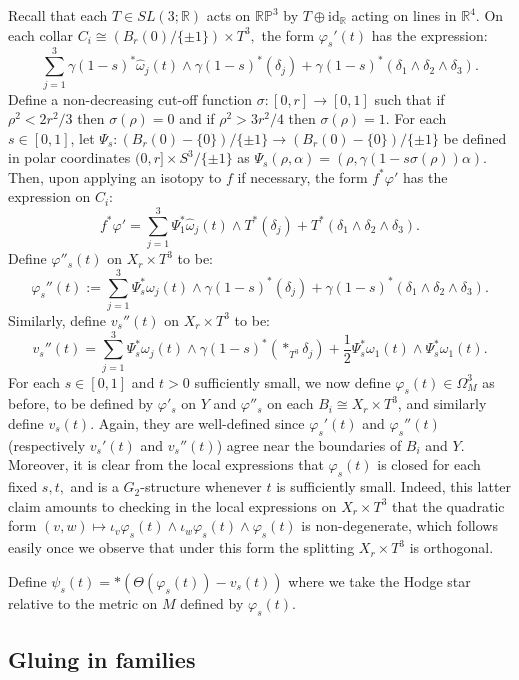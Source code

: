 \documentclass{amsart}
\theoremstyle{theorem}
\theoremstyle{definition}
\theoremstyle{definition}
\theoremstyle{definition}
\theoremstyle{theorem}
\theoremstyle{theorem}
\theoremstyle{theorem}
\theoremstyle{corollary}
\theoremstyle{question}
\theoremstyle{remark}
\begin{document}
Recall that each $T\in SL(3; \mathbb{R})$ acts on $\mathbb{RP}^3$ by $T\oplus \text{id}_\mathbb{R}$ acting on lines in $\mathbb{R}^4.$ On each collar $C_i\cong (B_r(0)/\{\pm1\})\times T^3,$ the form $\varphi_{s}'(t)$ has the expression: $$\sum_{j=1}^3\gamma(1-s)^*\hat\omega_j(t)\wedge\gamma(1-s)^*(\delta_j) + \gamma(1-s)^*(\delta_1\wedge\delta_2\wedge\delta_3).$$ Define a non-decreasing cut-off function $\sigma:[0,r]\to[0,1]$ such that if $\rho^2<2r^2/3$ then $\sigma(\rho)=0$ and if $\rho^2>3r^2/4$ then $\sigma(\rho)=1.$ For each $s\in[0,1]$, let $\Psi_s:(B_r(0)-\{0\})/\{\pm1\}\to (B_r(0)-\{0\})/\{\pm1\}$ be defined in polar coordinates $(0,r]\times S^3/\{\pm1\}$ as $\Psi_s(\rho, \alpha) = (\rho, \gamma(1-s\sigma(\rho))\alpha).$ Then, upon applying an isotopy to $f$ if necessary, the form $f^*\varphi'$ has the expression on $C_i$: $$f^*\varphi'=\sum_{j=1}^3\Psi_1^*\hat\omega_j(t)\wedge T^*(\delta_j) + T^*(\delta_1\wedge\delta_2\wedge\delta_3).$$ Define $\varphi''_s(t)$ on $X_r\times T^3$ to be: $$\varphi_s''(t):=\sum_{j=1}^3\Psi_s^*\omega_j(t)\wedge \gamma(1-s)^*(\delta_j) + \gamma(1-s)^*(\delta_1\wedge\delta_2\wedge\delta_3).$$ Similarly, define $v_s''(t)$ on $X_r\times T^3$ to be: $$v_s''(t) = \sum_{j=1}^3 \Psi_s^*\omega_j(t)\wedge\gamma(1-s)^*(*_{T^3}\delta_j)+\frac12 \Psi_s^*\omega_1(t)\wedge\Psi_s^*\omega_1(t).$$For each $s\in[0,1]$ and $t>0$ sufficiently small, we now define $\varphi_s(t)\in \Omega^3_M$ as before, to be defined by $\varphi'_s$ on $Y$ and $\varphi''_s$ on each $B_i\cong X_r\times T^3$, and similarly define $v_s(t)$. Again, they are well-defined since $\varphi_s'(t)$ and $\varphi_s''(t)$ (respectively $v_s'(t)$ and $v_s''(t)$) agree near the boundaries of $B_i$ and $Y.$ Moreover, it is clear from the local expressions that $\varphi_s(t)$ is closed for each fixed $s, t,$ and is a $G_2$-structure whenever $t$ is sufficiently small. Indeed, this latter claim amounts to checking in the local expressions on $X_r\times T^3$ that the quadratic form $(v, w)\mapsto \iota_v\varphi_s(t)\wedge\iota_w\varphi_s(t)\wedge\varphi_s(t)$ is non-degenerate, which follows easily once we observe that under this form the splitting $X_r\times T^3$ is orthogonal.

Define $\psi_s(t) = *\left(\Theta(\varphi_s(t)) - v_s(t)\right)$ where we take the Hodge star relative to the metric on $M$ defined by $\varphi_s(t).$

\subsection{Gluing in families}
\end{document}
